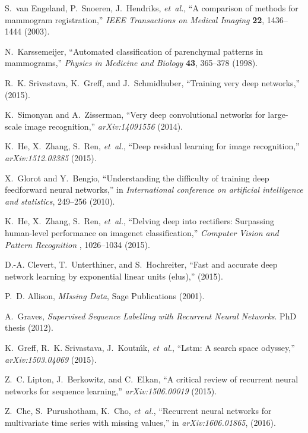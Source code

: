 \documentclass[12pt]{spieman}  %
\begin{document}
\begin{thebibliography}{10}
S.~van Engeland, P.~Snoeren, J.~Hendriks, {\em et~al.}, ``A comparison of
  methods for mammogram registration,'' {\em IEEE Transactions on Medical
  Imaging} {\bf 22}, 1436--1444  (2003).

N.~Karssemeijer, ``Automated classification of parenchymal patterns in
  mammograms,'' {\em Physics in Medicine and Biology} {\bf 43}, 365--378
  (1998).

R.~K. Srivastava, K.~Greff, and J.~Schmidhuber, ``Training very deep
  networks,''  (2015).

K.~Simonyan and A.~Zisserman, ``Very deep convolutional networks for
  large-scale image recognition,'' {\em arXiv:14091556}   (2014).

K.~He, X.~Zhang, S.~Ren, {\em et~al.}, ``Deep residual learning for image
  recognition,'' {\em arXiv:1512.03385}   (2015).

X.~Glorot and Y.~Bengio, ``Understanding the difficulty of training deep
  feedforward neural networks,'' in {\em International conference on artificial
  intelligence and statistics},  249--256  (2010).

K.~He, X.~Zhang, S.~Ren, {\em et~al.}, ``Delving deep into rectifiers:
  Surpassing human-level performance on imagenet classification,'' {\em
  Computer Vision and Pattern Recognition} , 1026--1034  (2015).

D.-A. Clevert, T.~Unterthiner, and S.~Hochreiter, ``Fast and accurate deep
  network learning by exponential linear units (elus),''  (2015).

P.~D. Allison, {\em MIssing Data}, Sage Publications  (2001).

A.~Graves, {\em Supervised Sequence Labelling with Recurrent Neural Networks}.
\newblock PhD thesis  (2012).

K.~Greff, R.~K. Srivastava, J.~Koutn{\'\i}k, {\em et~al.}, ``Lstm: A search
  space odyssey,'' {\em arXiv:1503.04069}   (2015).

Z.~C. Lipton, J.~Berkowitz, and C.~Elkan, ``A critical review of recurrent
  neural networks for sequence learning,'' {\em arXiv:1506.00019}   (2015).

Z.~Che, S.~Purushotham, K.~Cho, {\em et~al.}, ``Recurrent neural networks for
  multivariate time series with missing values,'' in {\em arXiv:1606.01865},
  (2016).


\end{thebibliography}
\end{document}
